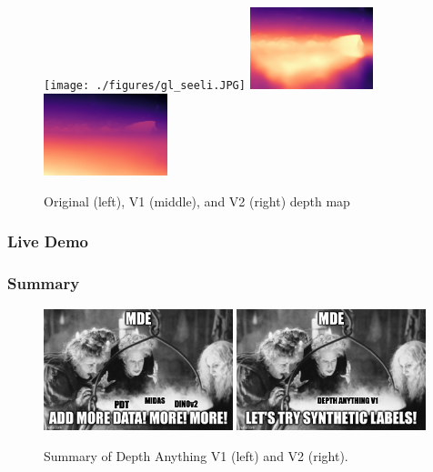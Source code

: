 \documentclass[12pt]{beamer}
\begin{document}
\begin{frame}
\begin{figure}
        \texttt{[image: ./figures/gl\_seeli.JPG]}
        \includegraphics[width=0.32\textwidth]{./figures/gl_seeli_v1-small.png}
        \includegraphics[width=0.32\textwidth]{./figures/gl_seeli_v2-small.png}
        \caption{Original (left), V1 (middle), and V2 (right) depth map}
        \label{fig:res_2}
    \end{figure}
\end{frame}

\begin{frame}
    \frametitle{Live Demo}
    
\end{frame}

\begin{frame}
    \frametitle{Summary}
    
        
    \begin{figure}
        \centering
        \includegraphics[width=0.49\textwidth]{./figures/summary_v1.jpg}
        \includegraphics[width=0.49\textwidth]{./figures/summary_v2.jpeg}
        \caption{Summary of Depth Anything V1 (left) and V2 (right).}
        \label{fig:summary}
    \end{figure}
\end{frame}
\end{document}
